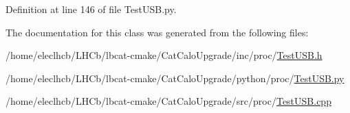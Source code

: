 Definition at line 146 of file TestUSB.py.

The documentation for this class was generated from the following files:\begin{DoxyCompactItemize}
\item 
/home/eleclhcb/LHCb/lbcat-\/cmake/CatCaloUpgrade/inc/proc/\hyperlink{TestUSB_8h}{TestUSB.h}\item 
/home/eleclhcb/LHCb/lbcat-\/cmake/CatCaloUpgrade/python/proc/\hyperlink{TestUSB_8py}{TestUSB.py}\item 
/home/eleclhcb/LHCb/lbcat-\/cmake/CatCaloUpgrade/src/proc/\hyperlink{TestUSB_8cpp}{TestUSB.cpp}\end{DoxyCompactItemize}
